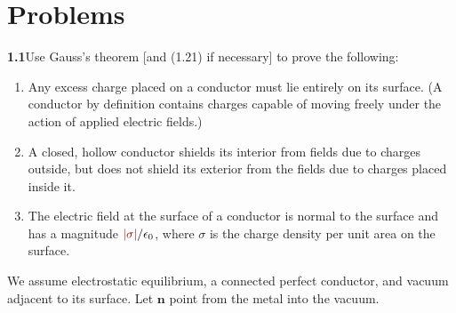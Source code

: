 
\section*{Problems}

\par\bigskip
\noindent\textbf{1.1}\quad Use Gauss's theorem [and (1.21) if necessary] to prove the following:
\begin{enumerate}
\item[(a)] Any excess charge placed on a conductor must lie entirely on its surface. (A conductor by definition contains charges capable of moving freely under the action of applied electric fields.)
\item[(b)] A closed, hollow conductor shields its interior from fields due to charges outside, but does not shield its exterior from the fields due to charges placed inside it. 
\item[(c)] The electric field at the surface of a conductor is normal to the surface and has a magnitude $\erratum{|\sigma|}/\epsilon_{0}$, where $\sigma$ is the charge density per unit area on the surface.
\end{enumerate}
\solution
We assume electrostatic equilibrium, a connected perfect conductor, and vacuum
adjacent to its surface. Let $\mathbf n$ point from the metal into the vacuum.
